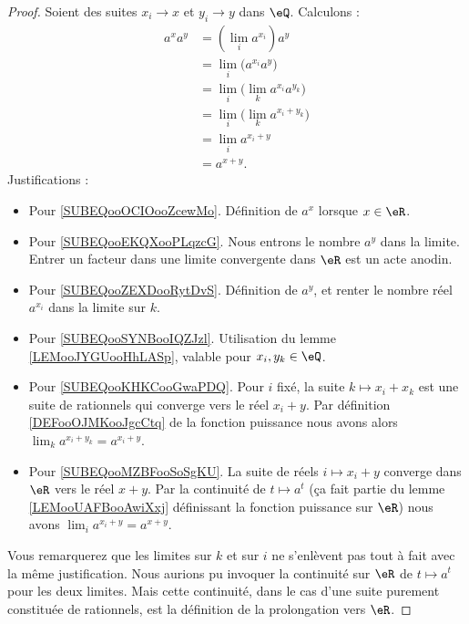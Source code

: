 \begin{proof}
    Soient des suites \( x_i\to x\) et \( y_i\to y\) dans \( \eQ\). Calculons :
    \begin{subequations}        \label{SUBEQSooMPNLooPoyjwJ}
        \begin{align}
            a^xa^y&=(\lim_ia^{x_i})a^y      \label{SUBEQooOCIOooZcewMo} \\
            &=\lim_i\big( a^{x_i}a^y \big)   \label{SUBEQooEKQXooPLqzcG}\\
            &=\lim_i\big( \lim_ka^{x_i}a^{y_k} \big)    \label{SUBEQooZEXDooRytDvS}\\
            &=\lim_i\big( \lim_k a^{x_i+y_k} \big)     \label{SUBEQooSYNBooIQZJzl}\\
            &=\lim_ia^{x_i+y}                           \label{SUBEQooKHKCooGwaPDQ}\\
            &=a^{x+y}.                                  \label{SUBEQooMZBFooSoSgKU}
        \end{align}
    \end{subequations}
    Justifications :
    \begin{itemize}
        \item Pour \ref{SUBEQooOCIOooZcewMo}. Définition de \( a^x\) lorsque \( x\in \eR\).
        \item Pour \ref{SUBEQooEKQXooPLqzcG}. Nous entrons le nombre \( a^y\) dans la limite. Entrer un facteur dans une limite convergente dans \( \eR\) est un acte anodin.
        \item Pour \ref{SUBEQooZEXDooRytDvS}. Définition de \( a^y\), et renter le nombre réel \( a^{x_i}\) dans la limite sur \( k\).
        \item Pour \ref{SUBEQooSYNBooIQZJzl}. Utilisation du lemme \ref{LEMooJYGUooHhLASp}, valable pour \( x_i,y_k\in \eQ\).
        \item Pour \ref{SUBEQooKHKCooGwaPDQ}. Pour \( i\) fixé, la suite \( k\mapsto x_i+x_k\) est une suite de rationnels qui converge vers le réel \( x_i+y\). Par définition \ref{DEFooOJMKooJgcCtq} de la fonction puissance nous avons alors \( \lim_ka^{x_i+y_k}=a^{x_i+y}\).
        \item Pour \ref{SUBEQooMZBFooSoSgKU}. La suite de réels \( i\mapsto x_i+y\) converge dans \( \eR\) vers le réel \( x+y\). Par la continuité de \( t\mapsto a^t\) (ça fait partie du lemme \ref{LEMooUAFBooAwiXxj} définissant la fonction puissance sur \( \eR\)) nous avons \( \lim_ia^{x_i+y}=a^{x+y}\).
    \end{itemize}

    Vous remarquerez que les limites sur \( k\) et sur \( i\) ne s'enlèvent pas tout à fait avec la même justification. Nous aurions pu invoquer la continuité sur \( \eR\) de \( t\mapsto a^t\) pour les deux limites. Mais cette continuité, dans le cas d'une suite purement constituée de rationnels, est la définition de la prolongation vers \( \eR\).
\end{proof}

